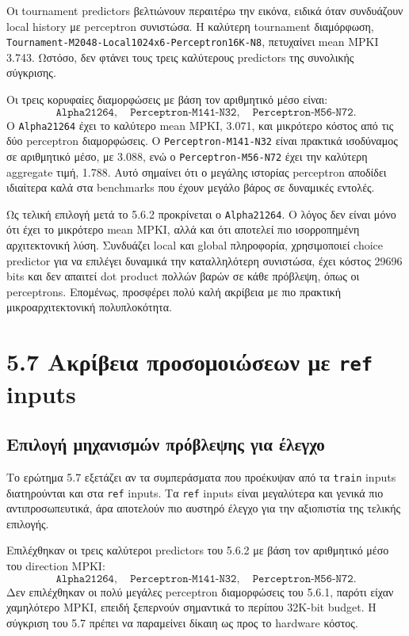 \documentclass{article}
\begin{document}
Οι tournament predictors βελτιώνουν περαιτέρω την εικόνα, ειδικά όταν συνδυάζουν local history με perceptron συνιστώσα. Η καλύτερη tournament διαμόρφωση, \texttt{Tournament-M2048-Local1024x6-Perceptron16K-N8}, πετυχαίνει mean MPKI 3.743. Ωστόσο, δεν φτάνει τους τρεις καλύτερους predictors της συνολικής σύγκρισης.

Οι τρεις κορυφαίες διαμορφώσεις με βάση τον αριθμητικό μέσο είναι:
\[
    \texttt{Alpha21264}, \quad
    \texttt{Perceptron-M141-N32}, \quad
    \texttt{Perceptron-M56-N72}.
\]
Ο \texttt{Alpha21264} έχει το καλύτερο mean MPKI, 3.071, και μικρότερο κόστος από τις δύο perceptron διαμορφώσεις. Ο \texttt{Perceptron-M141-N32} είναι πρακτικά ισοδύναμος σε αριθμητικό μέσο, με 3.088, ενώ ο \texttt{Perceptron-M56-N72} έχει την καλύτερη aggregate τιμή, 1.788. Αυτό σημαίνει ότι ο μεγάλης ιστορίας perceptron αποδίδει ιδιαίτερα καλά στα benchmarks που έχουν μεγάλο βάρος σε δυναμικές εντολές.

Ως τελική επιλογή μετά το 5.6.2 προκρίνεται ο \texttt{Alpha21264}. Ο λόγος δεν είναι μόνο ότι έχει το μικρότερο mean MPKI, αλλά και ότι αποτελεί πιο ισορροπημένη αρχιτεκτονική λύση. Συνδυάζει local και global πληροφορία, χρησιμοποιεί choice predictor για να επιλέγει δυναμικά την καταλληλότερη συνιστώσα, έχει κόστος 29696 bits και δεν απαιτεί dot product πολλών βαρών σε κάθε πρόβλεψη, όπως οι perceptrons. Επομένως, προσφέρει πολύ καλή ακρίβεια με πιο πρακτική μικροαρχιτεκτονική πολυπλοκότητα.

\FloatBarrier
\section{5.7 Ακρίβεια προσομοιώσεων με \texttt{ref} inputs}

\subsection{Επιλογή μηχανισμών πρόβλεψης για έλεγχο}

Το ερώτημα 5.7 εξετάζει αν τα συμπεράσματα που προέκυψαν από τα \texttt{train} inputs διατηρούνται και στα \texttt{ref} inputs. Τα \texttt{ref} inputs είναι μεγαλύτερα και γενικά πιο αντιπροσωπευτικά, άρα αποτελούν πιο αυστηρό έλεγχο για την αξιοπιστία της τελικής επιλογής.

Επιλέχθηκαν οι τρεις καλύτεροι predictors του 5.6.2 με βάση τον αριθμητικό μέσο του direction MPKI:
\[
    \texttt{Alpha21264}, \quad
    \texttt{Perceptron-M141-N32}, \quad
    \texttt{Perceptron-M56-N72}.
\]
Δεν επιλέχθηκαν οι πολύ μεγάλες perceptron διαμορφώσεις του 5.6.1, παρότι είχαν χαμηλότερο MPKI, επειδή ξεπερνούν σημαντικά το περίπου 32K-bit budget. Η σύγκριση του 5.7 πρέπει να παραμείνει δίκαιη ως προς το hardware κόστος.
\end{document}
